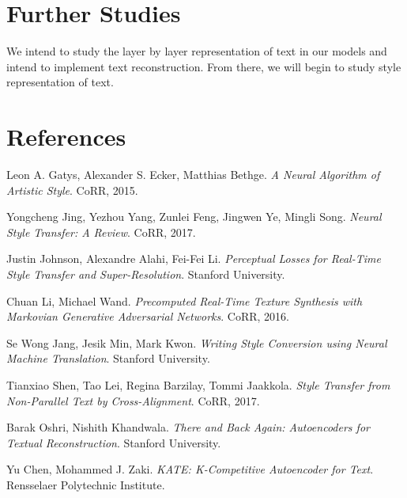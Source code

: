 \documentclass{article}
\begin{document}
\section{Further Studies}

We intend to study the layer by layer representation of text in our models and intend to implement text reconstruction. From there, we will begin to study style representation of text.

\section{References}

\begin{thebibliography}{9}
	Leon A. Gatys, Alexander S. Ecker, Matthias Bethge.
	\textit{A Neural Algorithm of Artistic Style}.
	CoRR, 2015.

	Yongcheng Jing, Yezhou Yang, Zunlei Feng, Jingwen Ye, Mingli Song.
	\textit{Neural Style Transfer: A Review}.
	CoRR, 2017.

	Justin Johnson, Alexandre Alahi, Fei-Fei Li.
	\textit{Perceptual Losses for Real-Time Style Transfer and Super-Resolution}.
	Stanford University.

	Chuan Li, Michael Wand.
	\textit{Precomputed Real-Time Texture Synthesis with Markovian Generative Adversarial Networks}.
	CoRR, 2016.

	Se Wong Jang, Jesik Min, Mark Kwon.
	\textit{Writing Style Conversion using Neural Machine Translation}.
	Stanford University.

	Tianxiao Shen, Tao Lei, Regina Barzilay, Tommi Jaakkola.
	\textit{Style Transfer from Non-Parallel Text by Cross-Alignment}.
	CoRR, 2017.

	Barak Oshri, Nishith Khandwala.
	\textit{There and Back Again: Autoencoders for Textual Reconstruction}.
	Stanford University.

	Yu Chen, Mohammed J. Zaki.
	\textit{KATE: K-Competitive Autoencoder for Text}. Rensselaer Polytechnic Institute.


\end{thebibliography}
\end{document}
